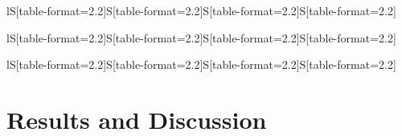 \documentclass[10pt,twoside,twocolumn,a4paper]{article}
\begin{document}
\begin{table}
\caption{Average RPD~[\%] from the optimum, $t_{\mathrm{ms}}=2000$~ms}
\label{tab:results_2000}
\begin{tabular}{lS[table-format=2.2]S[table-format=2.2]S[table-format=2.2]S[table-format=2.2]}

\end{tabular}
\end{table}

\begin{table}
\caption{Average RPD~[\%] from the optimum, $t_{\mathrm{ms}}=5000$~ms}
\label{tab:results_5000}
\begin{tabular}{lS[table-format=2.2]S[table-format=2.2]S[table-format=2.2]S[table-format=2.2]}

\end{tabular}
\end{table}

\begin{table}
\caption{Average RPD~[\%] from the optimum, $t_{\mathrm{ms}}=10000$~ms}
\label{tab:results_10000}
\begin{tabular}{lS[table-format=2.2]S[table-format=2.2]S[table-format=2.2]S[table-format=2.2]}

\end{tabular}
\end{table}


\section{Results and Discussion}

%



\end{document}
